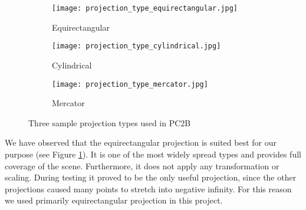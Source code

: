 \begin{figure}[h]
	\centering
	\begin{subfigure}[b]{0.3\textwidth}
		\centering
		\texttt{[image: projection\_type\_equirectangular.jpg]}
		\caption{Equirectangular}
		\label{fig:equirectangular}
	\end{subfigure}
	\hfill
	\begin{subfigure}[b]{0.3\textwidth}
		\centering
		\texttt{[image: projection\_type\_cylindrical.jpg]}
		\caption{Cylindrical}
		\label{fig:cylindrical}
	\end{subfigure}
	\hfill
	\begin{subfigure}[b]{0.3\textwidth}
		\centering
		\texttt{[image: projection\_type\_mercator.jpg]}
		\caption{Mercator}
		\label{fig:mercator}
	\end{subfigure}
	\caption{Three sample projection types used in PC2B}
	\label{fig:three_projections}
\end{figure}

We have observed that the equirectangular projection is suited best for our purpose (see Figure \ref{fig:equirectangular}). It is one of the most widely spread types and provides full coverage of the scene. Furthermore, it does not apply any transformation or scaling. During testing it proved to be the only useful projection, since the other projections caused many points to stretch into negative infinity. For this reason we used primarily equirectangular projection in this project.
